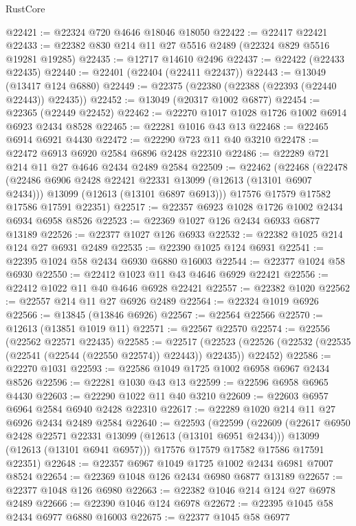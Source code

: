 \begin{lexlean}{RustCore}
\begin{coremodule}
@22421 := @22324 @720 @4646 @18046 @18050
@22422 := @22417 @22421
@22433 := @22382 @830 @214 @11 @27 @5516 @2489 (@22324 @829 @5516 @19281 @19285)
@22435 := @12717 @14610 @2496
@22437 := @22422 (@22433 @22435)
@22440 := @22401 (@22404 (@22411 @22437))
@22443 := @13049 (@13417 @124 @6880)
@22449 := @22375 (@22380 (@22388 (@22393 (@22440 @22443)) @22435))
@22452 := @13049 (@20317 @1002 @6877)
@22454 := @22365 (@22449 @22452)
@22462 := @22270 @1017 @1028 @1726 @1002 @6914 @6923 @2434 @8528
@22465 := @22281 @1016 @43 @13
@22468 := @22465 @6914 @6921 @4430
@22472 := @22290 @723 @11 @40 @3210
@22478 := @22472 @6913 @6920 @2584 @6896 @2428 @22310
@22486 := @22289 @721 @214 @11 @27 @4646 @2434 @2489 @2584
@22509 := @22462
    (@22468
      (@22478
        (@22486 @6906 @2428 @22421 @22331 @13099 (@12613 (@13101 @6907 @2434)))
        @13099
        (@12613 (@13101 @6897 @6913)))
      @17576
      @17579
      @17582
      @17586
      @17591
      @22351)
@22517 := @22357 @6923 @1028 @1726 @1002 @2434 @6934 @6958 @8526
@22523 := @22369 @1027 @126 @2434 @6933 @6877 @13189
@22526 := @22377 @1027 @126 @6933
@22532 := @22382 @1025 @214 @124 @27 @6931 @2489
@22535 := @22390 @1025 @124 @6931
@22541 := @22395 @1024 @58 @2434 @6930 @6880 @16003
@22544 := @22377 @1024 @58 @6930
@22550 := @22412 @1023 @11 @43 @4646 @6929 @22421
@22556 := @22412 @1022 @11 @40 @4646 @6928 @22421
@22557 := @22382 @1020
@22562 := @22557 @214 @11 @27 @6926 @2489
@22564 := @22324 @1019 @6926
@22566 := @13845 (@13846 @6926)
@22567 := @22564 @22566
@22570 := @12613 (@13851 @1019 @11)
@22571 := @22567 @22570
@22574 := @22556 (@22562 @22571 @22435)
@22585 := @22517
    (@22523 (@22526 (@22532 (@22535 (@22541 (@22544 (@22550 @22574)) @22443)) @22435)) @22452)
@22586 := @22270 @1031
@22593 := @22586 @1049 @1725 @1002 @6958 @6967 @2434 @8526
@22596 := @22281 @1030 @43 @13
@22599 := @22596 @6958 @6965 @4430
@22603 := @22290 @1022 @11 @40 @3210
@22609 := @22603 @6957 @6964 @2584 @6940 @2428 @22310
@22617 := @22289 @1020 @214 @11 @27 @6926 @2434 @2489 @2584
@22640 := @22593
    (@22599
      (@22609
        (@22617 @6950 @2428 @22571 @22331 @13099 (@12613 (@13101 @6951 @2434)))
        @13099
        (@12613 (@13101 @6941 @6957)))
      @17576
      @17579
      @17582
      @17586
      @17591
      @22351)
@22648 := @22357 @6967 @1049 @1725 @1002 @2434 @6981 @7007 @8524
@22654 := @22369 @1048 @126 @2434 @6980 @6877 @13189
@22657 := @22377 @1048 @126 @6980
@22663 := @22382 @1046 @214 @124 @27 @6978 @2489
@22666 := @22390 @1046 @124 @6978
@22672 := @22395 @1045 @58 @2434 @6977 @6880 @16003
@22675 := @22377 @1045 @58 @6977

\end{coremodule}
\end{lexlean}
